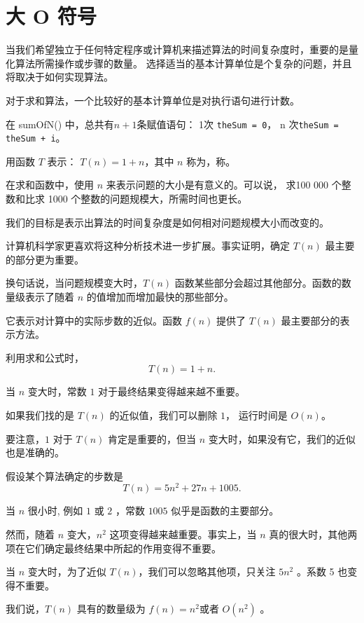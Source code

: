 \section{大 O 符号}
\begin{frame}\ft{\secname}
  当我们希望独立于任何特定程序或计算机来描述算法的时间复杂度时，重要的是量化算法所需操作或步骤的数量。
  选择适当的基本计算单位是个复杂的问题，并且将取决于如何实现算法。
\end{frame}

\begin{frame}\ft{\secname}
  对于求和算法，一个比较好的基本计算单位是对执行语句进行计数。

  在 sumOfN() 中，总共有$n+1$条赋值语句： 1次 \lstinline|theSum = 0|， n 次\lstinline|theSum = theSum + i|。


  用函数 $T$ 表示： $T(n)=1 + n$，其中 $n$ 称为，称。

  在求和函数中，使用 $n$ 来表示问题的大小是有意义的。可以说， 求100 000 个整数和比求 1000 个整数的问题规模大，所需时间也更长。

  我们的目标是表示出算法的时间复杂度是如何相对问题规模大小而改变的。
\end{frame}

\begin{frame}\ft{\secname}
  计算机科学家更喜欢将这种分析技术进一步扩展。事实证明，确定 $T(n)$ 最主要的部分更为重要。

  换句话说，当问题规模变大时，$T(n)$ 函数某些部分会超过其他部分。函数的数量级表示了随着 $n$ 的值增加而增加最快的那些部分。

  它表示对计算中的实际步数的近似。函数 $f(n)$ 提供了 $T(n)$ 最主要部分的表示方法。
\end{frame}

\begin{frame}\ft{\secname}

  利用求和公式时，
  $$
  T(n) = 1 + n.
  $$


  当 $n$ 变大时，常数 $1$ 对于最终结果变得越来越不重要。

  如果我们找的是 $T(n)$ 的近似值，我们可以删除 $1$， 运行时间是 $O(n)$。

  要注意，$1$ 对于 $T(n)$ 肯定是重要的，但当 $n$ 变大时，如果没有它，我们的近似也是准确的。
\end{frame}

\begin{frame}\ft{\secname}
  假设某个算法确定的步数是
  $$
  T(n)=5n^2 +27n+1005.
  $$

  当 $n$ 很小时, 例如 $1$ 或 $2$ ，常数 $1005$ 似乎是函数的主要部分。

  然而，随着 $n$ 变大，$n^2$ 这项变得越来越重要。事实上，当 $n$ 真的很大时，其他两项在它们确定最终结果中所起的作用变得不重要。

  当 $n$ 变大时，为了近似 $T(n)$，我们可以忽略其他项，只关注 $5n^2$ 。系数 5 也变得不重要。


  我们说，$T(n)$ 具有的数量级为 $f(n)=n^2$或者 $O( n^2 )$ 。
\end{frame}

